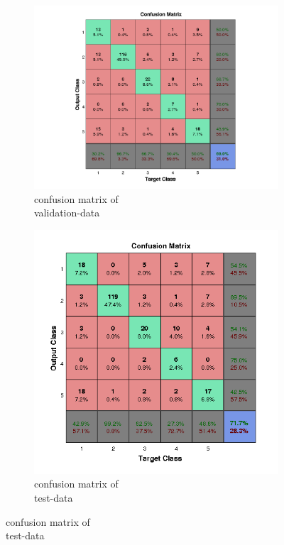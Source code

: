 \documentclass[fleqn]{article}
\begin{document}
\begin{figure}[!ht]
\begin{subfigure}{.5\textwidth}
\caption{confusion matrix of\\ validation-data}
\includegraphics[scale=0.4]{./pics/imagedata/_16_10/_16_10_epoch_Inf_confusion}
\end{subfigure}
\begin{subfigure}{.5\textwidth}
\caption{confusion matrix of\\ test-data}
\includegraphics[scale=0.4]{./pics/imagedata/_16_10/_16_10_epoch_Inf_confusiontest}
\end{subfigure}
\end{figure}
\end{document}
